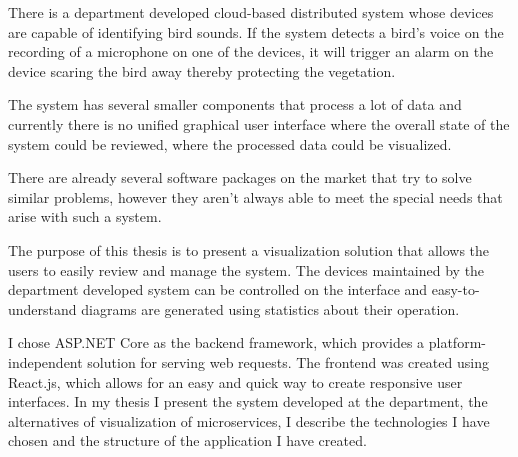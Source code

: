 There is a department developed cloud-based distributed system whose devices are capable of identifying bird sounds.
If the system detects a bird's voice on the recording of a microphone on one of the devices, it will trigger
an alarm on the device scaring the bird away thereby protecting the vegetation.

The system has several smaller components that process a lot of data and currently there is no unified graphical user interface where the overall state of the system 
could be reviewed, where the processed data could be visualized.

There are already several software packages on the market that try to solve similar problems, 
however they aren't always able to meet the special needs that arise with such a system.

The purpose of this thesis is to present a visualization solution that allows the users to easily review
and manage the system. The devices maintained by the department developed system can be controlled on the interface
and easy-to-understand diagrams are generated using statistics about their operation.

I chose ASP.NET Core as the backend framework, which provides a platform-independent solution for serving web requests.
The frontend was created using React.js, which allows for an easy and quick way to create responsive user interfaces.
In my thesis I present the system developed at the department, the alternatives of visualization of microservices,
I describe the technologies I have chosen and the structure of the application I have created.

\vfill
\selectthesislanguage

\setcounter{romanPage}{\value{page}}
